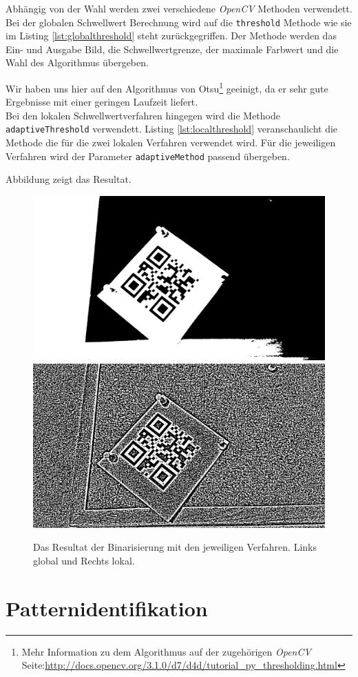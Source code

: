 Abhängig von der Wahl werden zwei verschiedene \emph{OpenCV} Methoden verwendett. Bei der globalen Schwellwert Berechnung wird auf die \texttt{threshold} Methode wie sie im Listing \ref{lst:globalthreshold} steht zurückgegriffen. Der Methode werden das Ein- und Ausgabe Bild, die Schwellwertgrenze, der maximale Farbwert und die Wahl des Algorithmus übergeben. 

Wir haben uns hier auf den Algorithmus von Otsu\footnote{Mehr Information zu dem Algorithmus auf der zugehörigen \emph{OpenCV} Seite:\url{http://docs.opencv.org/3.1.0/d7/d4d/tutorial_py_thresholding.html}} geeinigt, da er sehr gute Ergebnisse mit einer geringen Laufzeit liefert.\\

Bei den lokalen Schwellwertverfahren hingegen wird die Methode \texttt{adaptiveThreshold} verwendett. Listing \ref{lst:localthreshold} veranschaulicht die Methode die für die zwei lokalen Verfahren verwendet wird. Für die jeweiligen Verfahren wird der Parameter \texttt{adaptiveMethod} passend übergeben.

Abbildung  zeigt das Resultat.


\begin{figure}[h]
\center
\includegraphics[scale=0.1]{images/qrcode-adler-wand_1___BINARIZED___.jpg}
\hspace{5px}
\includegraphics[scale=0.1]{images/qrcode-adler-wand_2___BINARIZED___.jpg}
\caption{Das Resultat der Binarisierung mit den jeweiligen Verfahren. Links global und Rechts lokal.}
\end{figure}

\chapter{Patternidentifikation}
